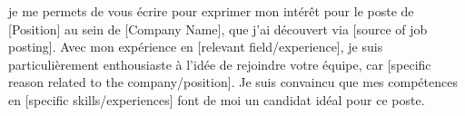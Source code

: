 

je me permets de vous écrire pour exprimer mon intérêt pour le poste de [Position] au sein de [Company Name], que j'ai découvert via [source of job posting]. Avec mon expérience en [relevant field/experience], je suis particulièrement enthousiaste à l'idée de rejoindre votre équipe, car [specific reason related to the company/position]. Je suis convaincu que mes compétences en [specific skills/experiences] font de moi un candidat idéal pour ce poste.
